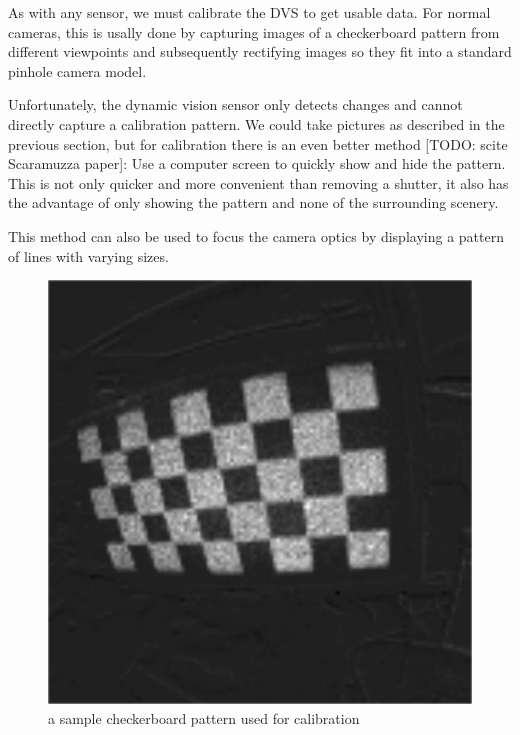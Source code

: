 As with any sensor, we must calibrate the DVS to get usable data. For normal
cameras, this is usally done by capturing images of a checkerboard pattern from
different viewpoints and subsequently rectifying images so they fit into a
standard pinhole camera model.

Unfortunately, the dynamic vision sensor only detects changes and cannot
directly capture a calibration pattern. We could take pictures as described in
the previous section, but for calibration there is an even better method [TODO: scite Scaramuzza paper]: Use a
computer screen to quickly show and hide the pattern. This is not only quicker
and more convenient than removing a shutter, it also has the advantage of only
showing the pattern and none of the surrounding scenery.

This method can also be used to focus the camera optics by displaying a pattern
of lines with varying sizes.

\begin{figure}
\includegraphics[width=\linewidth]{images/checkerboard_integrated.png}
\caption{a sample checkerboard pattern used for calibration}
\label{fig:calibration}
\end{figure}
